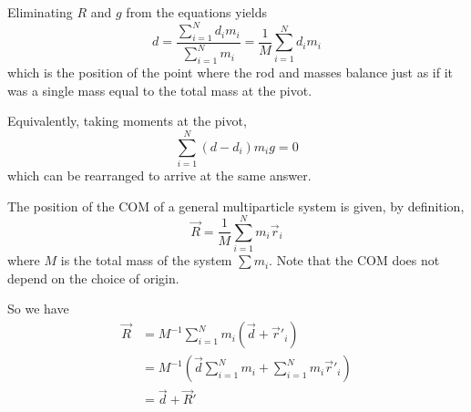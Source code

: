 \documentclass[12pt]{article}
\begin{document}
Eliminating $R$ and $g$ from the equations yields
\[
d = \frac{\sum_{i=1}^{N} d_im_i}{\sum_{i=1}^{N}m_i} = \frac{1}{M}\sum_{i=1}^{N}d_im_i
\]
which is the position of the point where
the rod and masses balance 
just as if it was a single mass equal to the total mass
at the pivot.

Equivalently, taking moments at the pivot,
\[
\sum_{i=1}^{N}(d-d_i)m_i g = 0
\]
which can be rearranged to arrive at the same answer.

The position of the COM of a general multiparticle system
is given, by definition,
\[
\vec{R} = \frac{1}{M}\sum_{i=1}^{N}m_i \vec{r}_i
\]
where $M$ is the total mass of the system $\sum m_i$.
Note that the COM does not depend on the choice of origin.

\begin{center}
\end{center}

So we have 
\begin{align*}
    \vec{R} &= M^{-1}\sum_{i=1}^{N} m_i (\vec{d} + \vec{r}'_i)\\
            &= M^{-1}\left(\vec{d} \sum_{i=1}^{N}m_i + \sum_{i=1}^{N}m_i \vec{r}'_i\right)\\
            &= \vec{d} + \vec{R}'
\end{align*}
\end{document}
